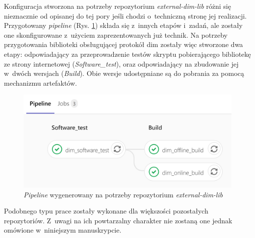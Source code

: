 \newpage

Konfiguracja stworzona na potrzeby repozytorium \textit{external-dim-lib} różni się nieznacznie od opisanej do tej pory jeśli chodzi o~techniczną stronę jej realizacji. Przygotowany \textit{pipeline} (Rys. \ref{fig:pipelineDIM}) składa się z~innych etapów i~zadań, ale zostały one skonfigurowane z~użyciem zaprezentowanych już technik. Na potrzeby przygotowania biblioteki obsługującej protokół \gls*{dim} zostały więc stworzone dwa etapy: odpowiadający za przeprowadzenie testów skryptu pobierającego bibliotekę ze strony internetowej (\textit{Software\_test}), oraz odpowiadający na zbudowanie jej w~dwóch wersjach (\textit{Build}). Obie wersje udostępniane są do pobrania za pomocą mechanizmu artefaktów.  

\begin{figure}[H]
\centering
\includegraphics[width=\textwidth]{res/png/pipelineDIM}
\caption{\textit{Pipeline} wygenerowany na potrzeby repozytorium \textit{external-dim-lib}}
\label{fig:pipelineDIM}
\end{figure}

Podobnego typu prace zostały wykonane dla większości pozostałych repozytoriów. Z~uwagi na ich powtarzalny charakter nie zostaną one jednak omówione w~niniejszym manuskrypcie. 

